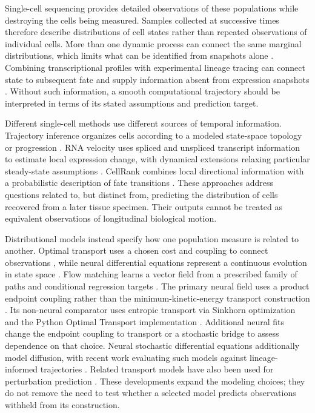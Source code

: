 \documentclass[10pt,a4paper]{article}
\begin{document}
Single-cell sequencing provides detailed observations of these populations while destroying the cells being measured. Samples collected at successive times therefore describe distributions of cell states rather than repeated observations of individual cells. More than one dynamic process can connect the same marginal distributions, which limits what can be identified from snapshots alone \citep{weinreb2018}. Combining transcriptional profiles with experimental lineage tracing can connect state to subsequent fate and supply information absent from expression snapshots \citep{weinreb2020}. Without such information, a smooth computational trajectory should be interpreted in terms of its stated assumptions and prediction target.

Different single-cell methods use different sources of temporal information. Trajectory inference organizes cells according to a modeled state-space topology or progression \citep{saelens2019}. RNA velocity uses spliced and unspliced transcript information to estimate local expression change, with dynamical extensions relaxing particular steady-state assumptions \citep{lamanno2018,bergen2020}. CellRank combines local directional information with a probabilistic description of fate transitions \citep{lange2022}. These approaches address questions related to, but distinct from, predicting the distribution of cells recovered from a later tissue specimen. Their outputs cannot be treated as equivalent observations of longitudinal biological motion.

Distributional models instead specify how one population measure is related to another. Optimal transport uses a chosen cost and coupling to connect observations \citep{schiebinger2019,peyre2019}, while neural differential equations represent a continuous evolution in state space \citep{chen2018ode,tong2020trajectory}. Flow matching learns a vector field from a prescribed family of paths and conditional regression targets \citep{lipman2023,tong2023,lipman2024guide}. The primary neural field uses a product endpoint coupling rather than the minimum-kinetic-energy transport construction \citep{benamou2000}. Its non-neural comparator uses entropic transport via Sinkhorn optimization and the Python Optimal Transport implementation \citep{cuturi2013,flamary2021}. Additional neural fits change the endpoint coupling to transport or a stochastic bridge to assess dependence on that choice. Neural stochastic differential equations additionally model diffusion, with recent work evaluating such models against lineage-informed trajectories \citep{vinyard2025}. Related transport models have also been used for perturbation prediction \citep{bunne2023}. These developments expand the modeling choices; they do not remove the need to test whether a selected model predicts observations withheld from its construction.
\end{document}
